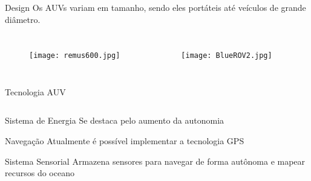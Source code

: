 \begin{frame}[c]{Design}
    Os AUVs variam em tamanho, sendo eles portáteis até veículos de grande diâmetro.
    \newline
    \begin{columns}[t]
        
        \begin{figure}
            \texttt{[image: remus600.jpg]}%
            \caption{\nocite{REMUS6001:online}}
        \end{figure}
        
        \begin{figure}
            \texttt{[image: BlueROV2.jpg]}%
            \caption{\nocite{BlueROV210:online}}
        \end{figure}
        
    \end{columns}
\end{frame}

\begin{frame}[t]{Tecnologia AUV}
    \transboxout[duration=0.5]
    \begin{columns}
    \end{columns}

    \begin{block}{Sistema de Energia}
        Se destaca pelo aumento da autonomia
    \end{block}

    \begin{block}{Navegação}
        Atualmente é possível implementar a tecnologia GPS
    \end{block}

    \begin{block}{Sistema Sensorial}
        Armazena sensores para navegar de forma autônoma e mapear recursos do oceano
    \end{block}
\end{frame}

